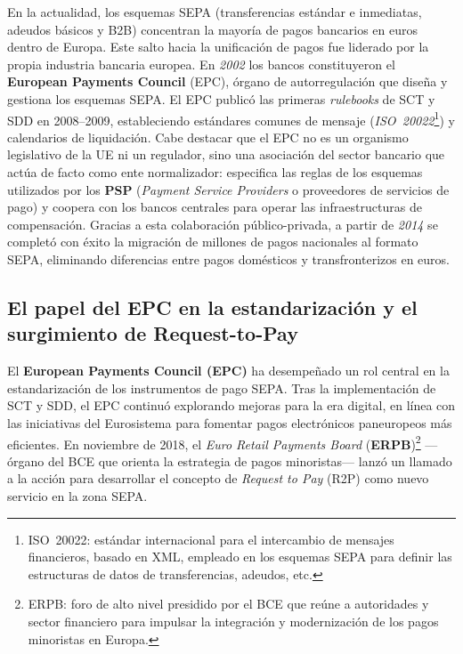 En la actualidad, los esquemas SEPA (transferencias estándar e inmediatas, adeudos básicos y B2B) concentran la mayoría de pagos bancarios en euros dentro de Europa. Este salto hacia la unificación de pagos fue liderado por la propia industria bancaria europea. En \textit{2002} los bancos constituyeron el \textbf{European Payments Council} (EPC), órgano de autorregulación que diseña y gestiona los esquemas SEPA. El EPC publicó las primeras \emph{rulebooks} de SCT y SDD en 2008–2009, estableciendo estándares comunes de mensaje (\emph{ISO~20022}\footnote{ISO~20022: estándar internacional para el intercambio de mensajes financieros, basado en XML, empleado en los esquemas SEPA para definir las estructuras de datos de transferencias, adeudos, etc.}) y calendarios de liquidación. Cabe destacar que el EPC no es un organismo legislativo de la UE ni un regulador, sino una asociación del sector bancario que actúa de facto como ente normalizador: especifica las reglas de los esquemas utilizados por los \textbf{PSP} (\emph{Payment Service Providers} o proveedores de servicios de pago) y coopera con los bancos centrales para operar las infraestructuras de compensación. Gracias a esta colaboración público-privada, a partir de \textit{2014} se completó con éxito la migración de millones de pagos nacionales al formato SEPA, eliminando diferencias entre pagos domésticos y transfronterizos en euros.

\subsection{El papel del EPC en la estandarización y el surgimiento de Request-to-Pay}
\label{subsec:epc-rtp}

El \textbf{European Payments Council (EPC)} ha desempeñado un rol central en la estandarización de los instrumentos de pago SEPA. Tras la implementación de SCT y SDD, el EPC continuó explorando mejoras para la era digital, en línea con las iniciativas del Eurosistema para fomentar pagos electrónicos paneuropeos más eficientes. En noviembre de 2018, el \emph{Euro Retail Payments Board} (\textbf{ERPB})\footnote{ERPB: foro de alto nivel presidido por el BCE que reúne a autoridades y sector financiero para impulsar la integración y modernización de los pagos minoristas en Europa.} —órgano del BCE que orienta la estrategia de pagos minoristas— lanzó un llamado a la acción para desarrollar el concepto de \emph{Request to Pay} (R2P) como nuevo servicio en la zona SEPA.  


